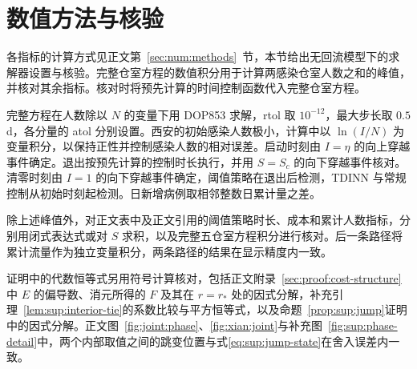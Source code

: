 \section{数值方法与核验}
\label{sec:sup:numerics}
各指标的计算方式见正文第~\ref{sec:num:methods}~节，本节给出无回流模型下的求解器设置与核验。完整仓室方程的数值积分用于计算两感染仓室人数之和的峰值，并核对其余指标。核对时将预先计算的时间控制函数代入完整仓室方程。

完整方程在人数除以 $N$ 的变量下用 DOP853 求解，rtol 取 $10^{-12}$，最大步长取 $0.5$ d，各分量的 atol 分别设置。西安的初始感染人数极小，计算中以 $\ln(I/N)$ 为变量积分，以保持正性并控制感染人数的相对误差。启动时刻由 $I=\eta$ 的向上穿越事件确定。退出按预先计算的控制时长执行，并用 $S=S_c$ 的向下穿越事件核对。清零时刻由 $I=1$ 的向下穿越事件确定，阈值策略在退出后检测，TDINN 与常规控制从初始时刻起检测。日新增病例取相邻整数日累计量之差。

除上述峰值外，对正文表中及正文引用的阈值策略时长、成本和累计人数指标，分别用闭式表达式或对 $S$ 求积，以及完整五仓室方程积分进行核对。后一条路径将累计流量作为独立变量积分，两条路径的结果在显示精度内一致。

证明中的代数恒等式另用符号计算核对，包括正文附录~\ref{sec:proof:cost-structure}中 $E$ 的偏导数、消元所得的 $F$ 及其在 $r=r_*$ 处的因式分解，补充引理~\ref{lem:sup:interior-tie}的系数比较与平方恒等式，以及命题~\ref{prop:sup:jump}证明中的因式分解。正文图~\ref{fig:joint:phase}、\ref{fig:xian:joint}与补充图~\ref{fig:sup:phase-detail}中，两个内部取值之间的跳变位置与式\eqref{eq:sup:jump-state}在舍入误差内一致。

